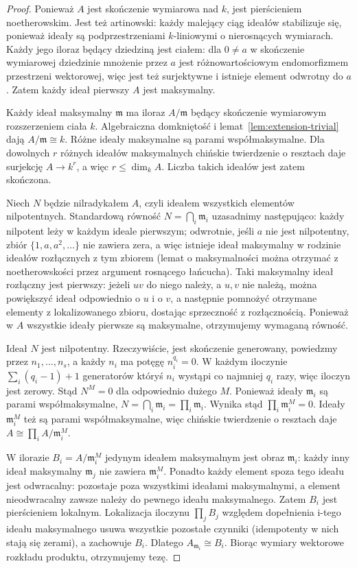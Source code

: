 \documentclass[11pt,a4paper,openany]{report}
\numberwithin{equation}{section}
\theoremstyle{plain}
\theoremstyle{definition}
\theoremstyle{remark}
\begin{document}
\begin{proof}
Ponieważ $A$ jest skończenie wymiarowa nad $k$, jest
pierścieniem noetherowskim. Jest też artinowski:
każdy malejący ciąg ideałów stabilizuje się, ponieważ
ideały są podprzestrzeniami $k$-liniowymi o nierosnących
wymiarach. Każdy jego iloraz będący dziedziną jest ciałem:
dla $0\ne a$ w skończenie wymiarowej dziedzinie
mnożenie przez $a$ jest różnowartościowym endomorfizmem
przestrzeni wektorowej, więc jest też surjektywne
i istnieje element odwrotny do $a$.
Zatem każdy ideał pierwszy $A$ jest maksymalny.

Każdy ideał maksymalny $\mathfrak m$ ma iloraz $A/\mathfrak m$
będący skończenie wymiarowym rozszerzeniem ciała $k$.
Algebraiczna domkniętość i lemat~\ref{lem:extension-trivial}
dają $A/\mathfrak m\cong k$.
Różne ideały maksymalne są parami współmaksymalne.
Dla dowolnych $r$ różnych ideałów maksymalnych chińskie
twierdzenie o resztach daje surjekcję $A\to k^r$,
a więc $r\le\dim_k A$. Liczba takich ideałów jest
zatem skończona.

Niech $N$ będzie nilradykałem $A$, czyli ideałem wszystkich
elementów nilpotentnych. Standardową równość
$N=\bigcap_i\mathfrak m_i$ uzasadnimy następująco:
każdy nilpotent leży w każdym ideale pierwszym;
odwrotnie, jeśli $a$ nie jest nilpotentny, zbiór
$\{1,a,a^2,\dots\}$ nie zawiera zera, a więc istnieje
ideał maksymalny w rodzinie ideałów rozłącznych z tym
zbiorem (lemat o maksymalności można otrzymać z
noetherowskości przez argument rosnącego łańcucha).
Taki maksymalny ideał rozłączny jest pierwszy:
jeżeli $uv$ do niego należy, a $u,v$ nie należą,
można powiększyć ideał odpowiednio o $u$ i o $v$,
a następnie pomnożyć otrzymane elementy z lokalizowanego
zbioru, dostając sprzeczność z rozłącznością.
Ponieważ w $A$ wszystkie ideały pierwsze są maksymalne,
otrzymujemy wymaganą równość.

Ideał $N$ jest nilpotentny. Rzeczywiście, jest skończenie
generowany, powiedzmy przez $n_1,\dots,n_s$, a każdy
$n_i$ ma potęgę $n_i^{q_i}=0$. W każdym iloczynie
$\sum_i(q_i-1)+1$ generatorów któryś $n_i$ wystąpi
co najmniej $q_i$ razy, więc iloczyn jest zerowy.
Stąd $N^M=0$ dla odpowiednio dużego $M$.
Ponieważ ideały $\mathfrak m_i$ są parami współmaksymalne,
$N=\bigcap_i\mathfrak m_i=\prod_i\mathfrak m_i$.
Wynika stąd $\prod_i\mathfrak m_i^M=0$.
Ideały $\mathfrak m_i^M$ też są parami współmaksymalne,
więc chińskie twierdzenie o resztach daje
$A\cong\prod_i A/\mathfrak m_i^M$.

W ilorazie $B_i=A/\mathfrak m_i^M$ jedynym ideałem maksymalnym
jest obraz $\mathfrak m_i$: każdy inny ideał maksymalny
$\mathfrak m_j$ nie zawiera $\mathfrak m_i^M$.
Ponadto każdy element spoza tego ideału jest odwracalny:
pozostaje poza wszystkimi ideałami maksymalnymi, a element
nieodwracalny zawsze należy do pewnego ideału maksymalnego.
Zatem $B_i$ jest pierścieniem lokalnym.
Lokalizacja iloczynu $\prod_j B_j$ względem dopełnienia
i-tego ideału maksymalnego usuwa wszystkie pozostałe czynniki
(idempotenty w nich stają się zerami), a zachowuje $B_i$.
Dlatego $A_{\mathfrak m_i}\cong B_i$. Biorąc wymiary
wektorowe rozkładu produktu, otrzymujemy tezę.
\end{proof}
\end{document}
